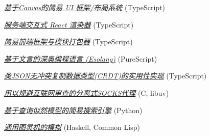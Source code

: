 \documentclass[11pt,twocolumn]{article}
\begin{document}
\href{https://galmungral.github.io/michelangelo}{\textit{基于Canvas的简易 UI 框架/布局系统}} \hfill (TypeScript)

\href{https://github.com/galmungral/react-teletype}{\textit{服务端交互式 React 渲染器}} \hfill (TypeScript)

\href{https://github.com/galmungral/replay}{\textit{简易前端框架与模块打包器}} \hfill (TypeScript)

\href{https://galmungral.github.io/hanbun-lang}{\textit{基于文言的深奥编程语言 (Esolang)}} \hfill (PureScript)

\href{https://github.com/galmungral/json-crdt}{\textit{类JSON无冲突复制数据类型(CRDT)的实用性实现}} \hfill (TypeScript)

\href{https://github.com/galmungral/telescope}{\textit{用以规避互联网审查的分离式SOCKS代理}} \hfill (C, libuv)

\href{https://github.com/galmungral/plato}{\textit{基于查询似然模型的简易搜索引擎}} \hfill (Python)

\href{https://github.com/galmungral/turing-machine}{\textit{通用图灵机的模拟}} \hfill (Haskell, Common Lisp)
\end{document}
